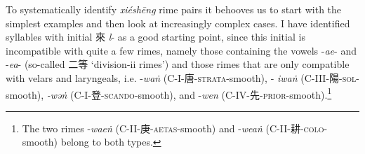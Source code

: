 To systematically identify  \textit{xiéshēng} rime pairs it behooves us to start with the simplest examples and then look at increasingly complex cases. I have identified syllables with initial 來 \textit{l}- as a good starting point, since this initial is incompatible with quite a few rimes, namely those containing the vowels -\textit{ae}- and -\textit{ea}- (so-called 二等 `division-ii rimes') and those rimes that are only compatible with velars and laryngeals, i.e. %
-\emph{waṅ} (C-I-唐-\textsc{strata}-smooth), 
‑ \emph{iwaṅ} (C-III-陽-\textsc{sol}-smooth),  
 \emph{-wəṅ} (C-I-登-\textsc{scando}-smooth),   and 
-\emph{wen} (C-IV-先-\textsc{prior}-smooth).\footnote{The two rimes 
-\emph{waeṅ} (C-II-庚-\textsc{aetas}-smooth) and  %
 -\emph{weaṅ} (C-II-耕-\textsc{colo}-smooth) belong to both types.} 
